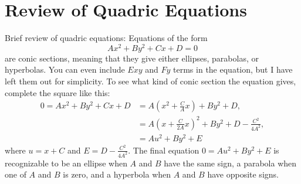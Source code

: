\documentclass[letterpaper, 12pt]{amsart}
\theoremstyle{definition}  							%
\begin{document}
	\section{Review of Quadric Equations}
	\label{sec:review_of_quadric_equations}
	Brief review of quadric equations: 
	Equations of the form $$Ax^2 + By^2 + Cx + D = 0$$ are conic sections, meaning that they give either ellipses, parabolas, or hyperbolas. 
	You can even include $Exy$ and $Fy$ terms in the equation, but I have left them out for simplicity. 
	To see what kind of conic section the equation gives, complete the square like this:
	\begin{align*}
	0 = Ax^2 + By^2 + Cx + D &= A \left( x^2 + \tfrac{C}{A}x \right) + By^2 + D, \\
	&= A \left( x + \tfrac{C}{2A}x \right)^2 + By^2 + D - \tfrac{C^2}{4A^2}, \\
	&= Au^2 + By^2 + E
	\end{align*}
	where $u = x + C$ and $E = D - \tfrac{C^2}{4A^2}$.
	The final equation $0 = Au^2 + By^2 + E$ is recognizable to be an ellipse when $A$ and $B$ have the same sign, a parabola when one of $A$ and $B$ is zero, and a hyperbola when $A$ and $B$ have opposite signs.
\end{document}

